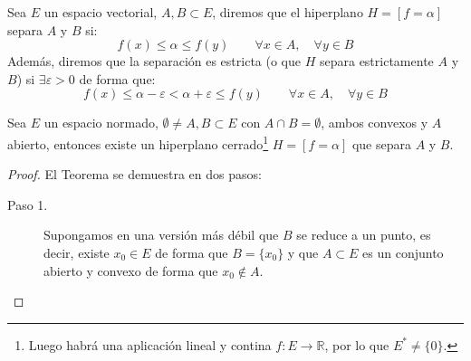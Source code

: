 \begin{definicion}
    Sea $E$ un espacio vectorial, $A,B\subset E$, diremos que el hiperplano $H=[f=\alpha]$ separa $A$ y $B$ si:
    \begin{equation*}
        f(x) \leq \alpha \leq f(y) \qquad \forall x\in A,\quad  \forall y\in B
    \end{equation*}
    Además, diremos que la separación es estricta (o que $H$ separa estrictamente $A$ y $B$) si $\exists \varepsilon>0$ de forma que:
    \begin{equation*}
        f(x) \leq \alpha - \varepsilon < \alpha+\varepsilon \leq f(y) \qquad \forall x\in A, \quad  \forall y\in B
    \end{equation*}
\end{definicion}

\begin{teo}
    Sea $E$ un espacio normado, $\emptyset \neq A,B\subset E$ con $A\cap B = \emptyset $, ambos convexos y $A$ abierto, entonces existe un hiperplano cerrado\footnote{Luego habrá una aplicación lineal y contina $f:E\to \mathbb{R}$, por lo que $E^\ast \neq \{0\}$.} $H = [f=\alpha]$ que separa $A$ y $B$.
    \begin{proof}
        El Teorema se demuestra en dos pasos:
        \begin{description}
            \item [Paso 1.] Supongamos en una versión más débil que $B$ se reduce a un punto, es decir, existe $x_0\in E$ de forma que $B = \{x_0\}$ y que $A\subset E$ es un conjunto abierto y convexo de forma que $x_0 \notin A$.


\end{description}
\end{proof}
\end{teo}
